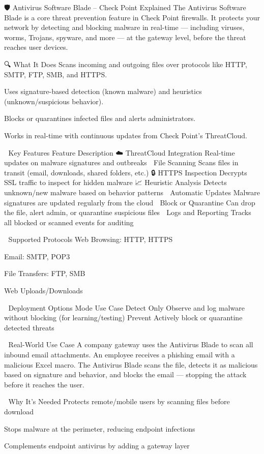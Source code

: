 🛡️ Antivirus Software Blade – Check Point Explained
The Antivirus Software Blade is a core threat prevention feature in Check Point firewalls. 
It protects your network by detecting and blocking malware in real-time — including viruses, 
worms, Trojans, spyware, and more — at the gateway level, before the threat reaches user devices.

🔍 What It Does
Scans incoming and outgoing files over protocols like HTTP, SMTP, FTP, SMB, and HTTPS.

Uses signature-based detection (known malware) and heuristics (unknown/suspicious behavior).

Blocks or quarantines infected files and alerts administrators.

Works in real-time with continuous updates from Check Point's ThreatCloud.

🔐 Key Features
Feature	Description
☁️ ThreatCloud Integration	Real-time updates on malware signatures and outbreaks
📁 File Scanning	Scans files in transit (email, downloads, shared folders, etc.)
🔒 HTTPS Inspection	Decrypts SSL traffic to inspect for hidden malware
📈 Heuristic Analysis	Detects unknown/new malware based on behavior patterns
🔁 Automatic Updates	Malware signatures are updated regularly from the cloud
🚫 Block or Quarantine	Can drop the file, alert admin, or quarantine suspicious files
📜 Logs and Reporting	Tracks all blocked or scanned events for auditing

🧰 Supported Protocols
Web Browsing: HTTP, HTTPS

Email: SMTP, POP3

File Transfers: FTP, SMB

Web Uploads/Downloads

🔧 Deployment Options
Mode	Use Case
Detect Only	Observe and log malware without blocking (for learning/testing)
Prevent	Actively block or quarantine detected threats

📘 Real-World Use Case
A company gateway uses the Antivirus Blade to scan all inbound email attachments. An employee receives a phishing email with a malicious Excel macro. The Antivirus Blade scans the file, detects it as malicious based on signature and behavior, and blocks the email — stopping the attack before it reaches the user.

🧠 Why It’s Needed
Protects remote/mobile users by scanning files before download

Stops malware at the perimeter, reducing endpoint infections

Complements endpoint antivirus by adding a gateway layer

